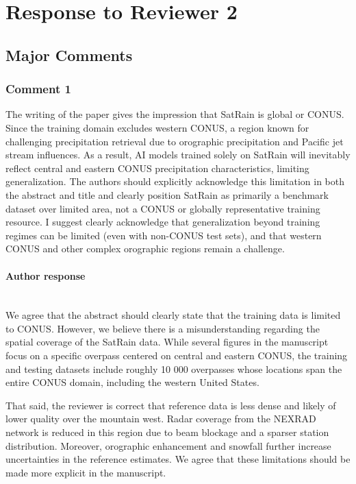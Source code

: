 \section*{Response to Reviewer 2}

\subsection*{Major Comments}

\subsubsection*{Comment 1}

\rc

The writing of the paper gives the impression that SatRain is global or CONUS.
Since the training domain excludes western CONUS, a region known for challenging
precipitation retrieval due to orographic precipitation and Pacific jet stream
influences. As a result, AI models trained solely on SatRain will inevitably
reflect central and eastern CONUS precipitation characteristics, limiting
generalization. The authors should explicitly acknowledge this limitation in
both the abstract and title and clearly position SatRain as primarily a
benchmark dataset over limited area, not a CONUS or globally representative
training resource. I suggest clearly acknowledge that generalization beyond
training regimes can be limited (even with non-CONUS test sets), and that
western CONUS and other complex orographic regions remain a challenge.

\reply

\paragraph*{Author response} \\

We agree that the abstract should clearly state that the training data is
limited to CONUS. However, we believe there is a misunderstanding regarding the
spatial coverage of the SatRain data. While several figures in the manuscript
focus on a specific overpass centered on central and eastern CONUS, the training
and testing datasets include roughly 10 000 overpasses whose locations span the
entire CONUS domain, including the western United States.

That said, the reviewer is correct that reference data is less dense and likely
of lower quality over the mountain west. Radar coverage from the NEXRAD network
is reduced in this region due to beam blockage and a sparser station
distribution. Moreover, orographic enhancement and snowfall further increase
uncertainties in the reference estimates. We agree that these limitations should
be made more explicit in the manuscript.


